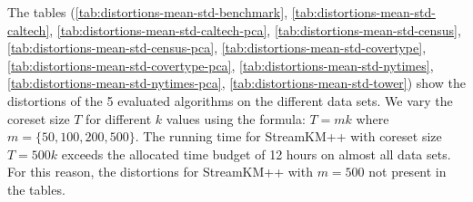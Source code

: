The tables 
(\cref{tab:distortions-mean-std-benchmark},
 \cref{tab:distortions-mean-std-caltech},
 \cref{tab:distortions-mean-std-caltech-pca},
 \cref{tab:distortions-mean-std-census},
 \cref{tab:distortions-mean-std-census-pca},
 \cref{tab:distortions-mean-std-covertype},
 \cref{tab:distortions-mean-std-covertype-pca},
 \cref{tab:distortions-mean-std-nytimes},
 \cref{tab:distortions-mean-std-nytimes-pca},
 \cref{tab:distortions-mean-std-tower})
 show the distortions of the 5 evaluated algorithms on the different data sets.
We vary the coreset size $T$ for different $k$ values using the formula: $T=mk$ where $m = \{50, 100, 200, 500\}$.
The running time for StreamKM++ with coreset size $T=500k$ exceeds the allocated time budget of 12 hours on almost all data sets.
For this reason, the distortions for StreamKM++ with $m=500$ not present in the tables.



